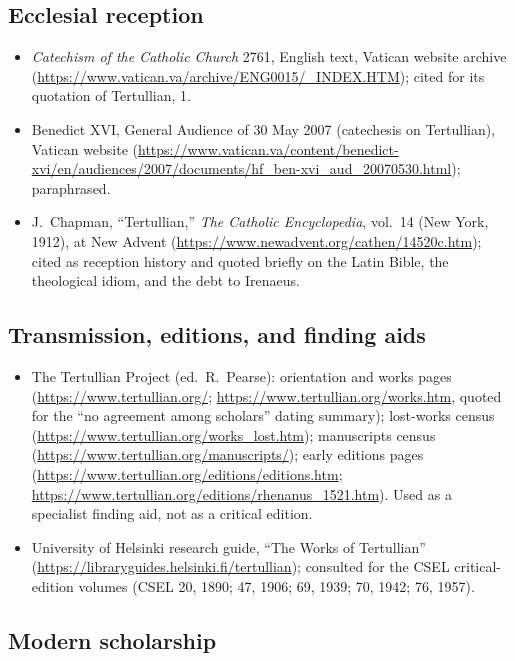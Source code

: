 \subsection*{Ecclesial reception}

\begin{itemize}
\item \textit{Catechism of the Catholic Church} 2761, English text, Vatican
website archive (\url{https://www.vatican.va/archive/ENG0015/_INDEX.HTM});
cited for its quotation of Tertullian,  1.
\item Benedict XVI, General Audience of 30 May 2007 (catechesis on
Tertullian), Vatican website
(\url{https://www.vatican.va/content/benedict-xvi/en/audiences/2007/documents/hf_ben-xvi_aud_20070530.html});
paraphrased.
\item J.~Chapman, ``Tertullian,'' \textit{The Catholic Encyclopedia}, vol.~14
(New York, 1912), at New Advent
(\url{https://www.newadvent.org/cathen/14520c.htm}); cited as reception
history and quoted briefly on the Latin Bible, the theological idiom, and the
debt to Irenaeus.
\end{itemize}

\subsection*{Transmission, editions, and finding aids}

\begin{itemize}
\item The Tertullian Project (ed.\ R.~Pearse): orientation and works pages
(\url{https://www.tertullian.org/}; \url{https://www.tertullian.org/works.htm},
quoted for the ``no agreement among scholars'' dating summary); lost-works
census (\url{https://www.tertullian.org/works_lost.htm}); manuscripts
census (\url{https://www.tertullian.org/manuscripts/}); early editions pages
(\url{https://www.tertullian.org/editions/editions.htm};
\url{https://www.tertullian.org/editions/rhenanus_1521.htm}). Used as a
specialist finding aid, not as a critical edition.
\item University of Helsinki research guide, ``The Works of Tertullian''
(\url{https://libraryguides.helsinki.fi/tertullian}); consulted for the CSEL
critical-edition volumes (CSEL 20, 1890; 47, 1906; 69, 1939; 70, 1942; 76,
1957).
\end{itemize}

\subsection*{Modern scholarship}

